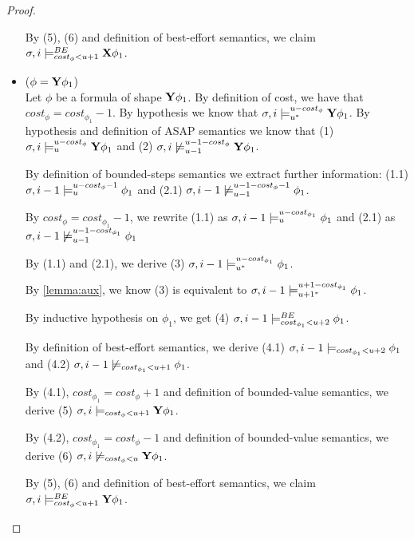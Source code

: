 \begin{theorem}
\begin{proof}
\begin{itemize}
    By (5), (6) and definition of best-effort semantics, we claim $\sigma,i \models_{cost_\phi < u + 1}^{BE} \mathbf{X} \phi_1$.

    \item ($\phi = \mathbf{Y} \phi_1$) \\
    Let $\phi$ be a formula of shape $\mathbf{Y} \phi_1$.
    By definition of cost, we have that $cost_\phi = cost_{\phi_1} - 1$.
    By hypothesis we know that $\sigma,i \models_{{u}^*}^{u-cost_\phi} \mathbf{Y} \phi_1$.
    By hypothesis and definition of ASAP semantics we know that
    (1) $\sigma,i \models_{u}^{u-cost_\phi} \mathbf{Y} \phi_1$ and
    (2) $\sigma,i \not\models_{u-1}^{u-1-cost_\phi} \mathbf{Y} \phi_1$.

    By definition of bounded-steps semantics we extract further information: 
    (1.1) $\sigma, i-1 \models_{u}^{u-cost_\phi-1} \phi_1$ and
    (2.1) $\sigma, i-1 \not\models_{u-1}^{u-1-cost_\phi-1} \phi_1$.

    By $cost_\phi = cost_{\phi_1} - 1$, we rewrite
    (1.1) as $\sigma, i-1 \models_{u}^{u-cost_{\phi_1}} \phi_1$ and 
    (2.1) as $\sigma, i-1 \not\models_{u-1}^{u-1-cost_{\phi_1}} \phi_1$
    
    By (1.1) and (2.1), we derive (3) $\sigma,i-1 \models_{{u}^*}^{u-cost_{\phi_1}} \phi_1$.

    By \autoref{lemma:aux}, we know (3) is equivalent to $\sigma,i-1 \models_{{u+1}^*}^{u+1-cost_{\phi_1}} \phi_1$.

    By inductive hypothesis on $\phi_1$, we get (4) $\sigma,i-1 \models_{cost_{\phi_1} < u+2}^{BE} \phi_1$.

    By definition of best-effort semantics, we derive (4.1) $\sigma,i-1 \models_{cost_{\phi_1} < u+2} \phi_1$ and (4.2) $\sigma,i-1 \not\models_{cost_{\phi_1} < u + 1} \phi_1$.

    By (4.1), $cost_{\phi_1} = cost_\phi + 1$ and definition of bounded-value semantics, we derive (5) $\sigma,i \models_{cost_\phi < u + 1} \mathbf{Y} \phi_1$.

    By (4.2), $cost_{\phi_1} = cost_\phi - 1$ and definition of bounded-value semantics, we derive  (6) $\sigma,i \not\models_{cost_\phi < u} \mathbf{Y} \phi_1$.

    By (5), (6) and definition of best-effort semantics, we claim $\sigma,i \models_{cost_\phi < u + 1}^{BE} \mathbf{Y} \phi_1$.


\end{itemize}
\end{proof}
\end{theorem}
